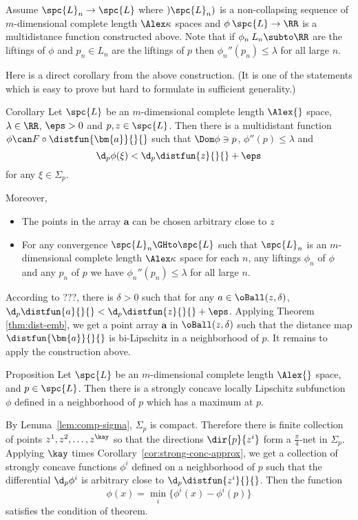 Assume $\spc{L}_n\to\spc{L}$ where $)\spc{L}_n)$ is a non-collapsing sequence of $m$-dimensional complete length $\Alex\kappa$ spaces
and $\phi\:\spc{L}\to \RR$ 
is a multidistance function constructed above. 
Note that if $\phi_n\:{L}_n\subto\RR$ are the liftings of $\phi$ and $p_n\in{L}_n$ are the liftings of $p$
then $\phi_n''(p_n)\le\lambda$ for all large $n$.
\qeds

Here is a direct corollary from the above construction.
(It is one of the statements which is easy to prove but hard to formulate in sufficient generality.)

\begin{thm}{Corollary}%
\label{cor:strong-conc-approx}
Let $\spc{L}$ be an $m$-dimensional complete length $\Alex{}$ space, 
$\lambda\in\RR$,
$\eps>0$
and $p,z\in \spc{L}$.
Then there is a multidistant function 
$\phi\can F\circ\distfun{\bm{a}}{}{}$
such that $\Dom\phi\ni p$,
$\phi''(p)\le\lambda$ and
$$\d_p\phi(\xi)<\d_p\distfun{z}{}{}+\eps$$
for any $\xi\in\Sigma_p$.

Moreover, 
\begin{itemize}
 \item The points in the array $\bm{a}$ can be chosen arbitrary close to $z$
 \item For any convergence $\spc{L}_n\GHto\spc{L}$
such that
$\spc{L}_n$ is an $m$-dimensional complete length $\Alex\kappa$ space for each $n$,
any liftings $\phi_n$ of $\phi$ and 
any $p_n$ of $p$ we have
$\phi_n''(p_n)\le\lambda$ for all large $n$.
\end{itemize}
\end{thm}

According to ???,
there is $\delta>0$ such that for any $a\in \oBall(z,\delta)$,
$\d_p\distfun{a}{}{}<\d_p\distfun{z}{}{}+\eps$.
Applying Theorem \ref{thm:dist-emb},
we get a point array $\bm{a}$ in $\oBall(z,\delta)$ such that
the distance map $\distfun{\bm{a}}{}{}$ is bi-Lipschitz in a neighborhood of $p$.
It remains to apply the construction above.
\qeds


\begin{thm}{Proposition}\label{prop:convex-function}
Let $\spc{L}$ be an $m$-dimensional complete length $\Alex{}$ space, 
and $p\in\spc{L}$.
Then there is a strongly concave locally Lipschitz subfunction $\phi$
defined in a neighborhood of $p$ which has a maximum at $p$.
\end{thm}

By Lemma~\ref{lem:comp-sigma}, $\Sigma_p$ is compact.
Therefore there is finite collection of points $z^1,z^2,\dots,z^\kay$
so that the directions $\dir{p}{z^i}$ form a $\tfrac\pi4$-net in $\Sigma_p$.
Applying $\kay$ times Corollary~\ref{cor:strong-conc-approx},
we get a collection of strongly concave functions $\phi^i$ 
defined on a neighborhood of $p$
such that the differential $\d_p\phi^i$ is arbitrary close to $\d_p\distfun{z^i}{}{}$.
Then the function 
\[\phi(x)=\min_i\{\phi^i(x)-\phi^i(p)\}\]
satisfies the condition of theorem.

